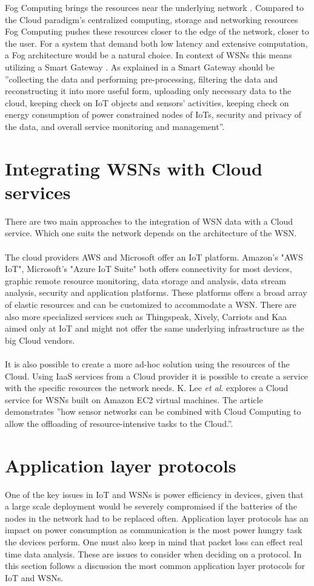 \documentclass[]{uiophd}
\begin{document}
Fog Computing brings the resources near the underlying network \cite{6984239}. Compared to the Cloud paradigm's centralized computing, storage and networking resources Fog Computing pushes these resources closer to the edge of the network, closer to the user. For a system that demand both low latency and extensive computation, a Fog architecture would be a natural choice. In context of WSNs this means utilizing a Smart Gateway \cite{6984239}. As explained in \cite{69842392} a Smart Gateway should be ''collecting the data and performing pre-processing, filtering the data and reconstructing it into more useful form, uploading only necessary data to the cloud, keeping check on IoT objects and sensors’ activities, keeping check on energy consumption of power constrained nodes of IoTs, security and privacy of the data, and overall service monitoring and management''. 

\section{Integrating WSNs with Cloud services}
There are two main approaches to the integration of WSN data with a Cloud service. Which one suits the network depends on the architecture of the WSN.
\\\\
The cloud providers AWS and Microsoft offer an IoT platform. Amazon's "AWS IoT", Microsoft's "Azure IoT Suite" both offers connectivity for most devices, graphic remote resource monitoring, data storage and analysis, data stream analysis, security and application platforms. These platforms offers a broad array of elastic resources and can be customized to accommodate a WSN. There are also more specialized services such as Thingspeak, Xively, Carriots and Kaa aimed only at IoT and might not offer the same underlying infrastructure as the big Cloud vendors.
\\\\
It is also possible to create a more ad-hoc solution using the resources of the Cloud. Using IaaS services from a Cloud provider it is possible to create a service with the specific resources the network needs. K. Lee \textit{et al}. \cite{5678063} explores a Cloud service for WSNs built on Amazon EC2 virtual machines. The article demonstrates ''how sensor networks can be combined with Cloud Computing to allow the offloading of resource-intensive tasks to the Cloud.''\cite{56780637}.

\section{Application layer protocols}
One of the key issues in IoT and WSNs is power efficiency in devices, given that a large scale deployment would be severely compromised if the batteries of the nodes in the network had to be replaced often. Application layer protocols has an impact on power consumption as communication is the most power hungry task the devices perform. One must also keep in mind that packet loss can effect real time data analysis. These are issues to consider when deciding on a protocol. In this section follows a discussion the most common application layer protocols for IoT and WSNs.
\end{document}
